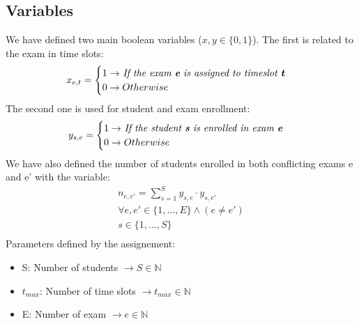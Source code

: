\documentclass[12pt]{article}
\begin{document}
\subsection{Variables}
We have defined two main boolean variables ($x,y \in \{0,1\} $). The first is related to the exam in time slots:
\begin{equation}
  \begin{gathered}
    x_{e,t} = \begin{cases} 1 \rightarrow $ \textit{If the exam \textbf{e} is assigned to timeslot \textbf{t}}$ \\ 0 \rightarrow Otherwise \end{cases}
  \end{gathered}
\end{equation}
The second one is used for student and exam enrollment:
\begin{equation}
  \begin{gathered}
    y_{s,e} = \begin{cases} 1 \rightarrow $ \textit{If the student \textbf{s} is enrolled in exam \textbf{e}}$ \\ 0 \rightarrow Otherwise \end{cases}
  \end{gathered}
\end{equation}
We have also defined the number of students enrolled in both conflicting exams e and e' with the variable:
\begin{equation}
  \begin{gathered}
    n_{e,e'} = \sum_{s = 1}^{S} y_{s,e} \cdot y_{s,e'}\\
    \forall e, e' \in \{1,...,E\} \wedge (e \neq e')\\
    s\in\{1,...,S\}\\
  \end{gathered}
\end{equation}
Parameters defined by the assignement:
\begin{itemize}
  \item S: Number of students $\rightarrow S \in \mathbb{N}$
  \item $t_{max}$: Number of time slots $\rightarrow t_{max} \in \mathbb{N}$
  \item E: Number of exam $\rightarrow e \in \mathbb{N}$
\end{itemize}
\end{document}
